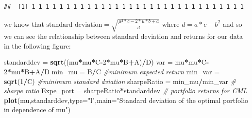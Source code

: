 \documentclass[]{article}
\newenvironment{Shaded}{\begin{snugshade}}{\end{snugshade}}
\newcommand{\KeywordTok}[1]{\textcolor[rgb]{0.13,0.29,0.53}{\textbf{#1}}}
\newcommand{\DataTypeTok}[1]{\textcolor[rgb]{0.13,0.29,0.53}{#1}}
\newcommand{\DecValTok}[1]{\textcolor[rgb]{0.00,0.00,0.81}{#1}}
\newcommand{\FloatTok}[1]{\textcolor[rgb]{0.00,0.00,0.81}{#1}}
\newcommand{\StringTok}[1]{\textcolor[rgb]{0.31,0.60,0.02}{#1}}
\newcommand{\CommentTok}[1]{\textcolor[rgb]{0.56,0.35,0.01}{\textit{#1}}}
\newcommand{\ControlFlowTok}[1]{\textcolor[rgb]{0.13,0.29,0.53}{\textbf{#1}}}
\newcommand{\OperatorTok}[1]{\textcolor[rgb]{0.81,0.36,0.00}{\textbf{#1}}}
\newcommand{\NormalTok}[1]{#1}
\begin{document}
\begin{Shaded}
\end{Shaded}

\begin{verbatim}
##  [1] 1 1 1 1 1 1 1 1 1 1 1 1 1 1 1 1 1 1 1 1 1 1 1 1 1 1 1 1 1 1 1
\end{verbatim}

we know that
\(\text{standard deviation} = \sqrt{\frac{\mu^2 * c - 2* \mu *b + a}{d}}\)
where \(d = a*c - b^2\) and so we can see the relationship between
standard deviation and returns for our data in the following figure:

\begin{Shaded}
\begin{Highlighting}[]
\NormalTok{standarddev =}\StringTok{ }\KeywordTok{sqrt}\NormalTok{((mu}\OperatorTok{*}\NormalTok{mu}\OperatorTok{*}\NormalTok{C}\OperatorTok{-}\DecValTok{2}\OperatorTok{*}\NormalTok{mu}\OperatorTok{*}\NormalTok{B}\OperatorTok{+}\NormalTok{A)}\OperatorTok{/}\NormalTok{D)}
\NormalTok{var =}\StringTok{ }\NormalTok{mu}\OperatorTok{*}\NormalTok{mu}\OperatorTok{*}\NormalTok{C}\OperatorTok{-}\DecValTok{2}\OperatorTok{*}\NormalTok{mu}\OperatorTok{*}\NormalTok{B}\OperatorTok{+}\NormalTok{A}\OperatorTok{/}\NormalTok{D}
\NormalTok{min_mu =}\StringTok{ }\NormalTok{B}\OperatorTok{/}\NormalTok{C }\CommentTok{#minimum expected return}
\NormalTok{min_var =}\StringTok{ }\KeywordTok{sqrt}\NormalTok{(}\DecValTok{1}\OperatorTok{/}\NormalTok{C) }\CommentTok{#minimum standard dviation}
\NormalTok{sharpeRatio =}\StringTok{ }\NormalTok{min_mu}\OperatorTok{/}\NormalTok{min_var }\CommentTok{# sharpe ratio}
\NormalTok{Expe_port =}\StringTok{ }\NormalTok{sharpeRatio}\OperatorTok{*}\NormalTok{standarddev }\CommentTok{# portfolio returns for CML}
\KeywordTok{plot}\NormalTok{(mu,standarddev,}\DataTypeTok{type=}\StringTok{"l"}\NormalTok{,}\DataTypeTok{main=}\StringTok{"Standard deviation of the optimal portfolio in dependence of mu"}\NormalTok{)}
\end{Highlighting}
\end{Shaded}
\end{document}
